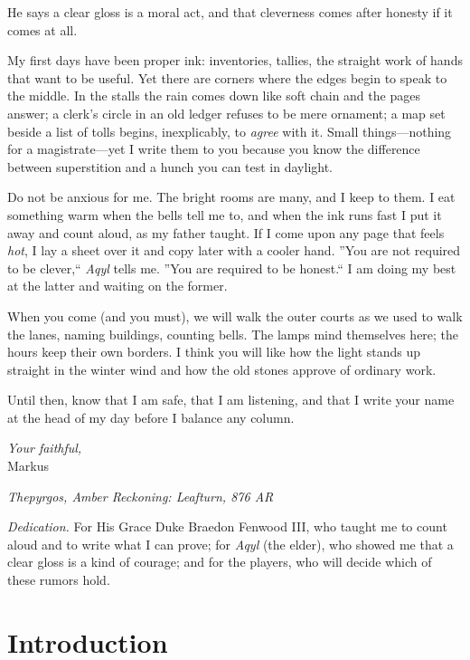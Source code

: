 \documentclass[11pt]{article}
\numberwithin{equation}{section} %
\theoremstyle{plain} %
\theoremstyle{definition} %
\theoremstyle{remark} %
\begin{document}
He says a clear gloss is a moral act, and that cleverness comes after honesty if it comes at all.

\medskip
My first days have been proper ink: inventories, tallies, the straight work of hands that want to be useful. Yet there are corners where the edges begin to speak to the middle. In the stalls the rain comes down like soft chain and the pages answer; a clerk's circle in an old ledger refuses to be mere ornament; a map set beside a list of tolls begins, inexplicably, to \emph{agree} with it. Small things---nothing for a magistrate---yet I write them to you because you know the difference between superstition and a hunch you can test in daylight.

Do not be anxious for me. The bright rooms are many, and I keep to them. I eat something warm when the bells tell me to, and when the ink runs fast I put it away and count aloud, as my father taught. If I come upon any page that feels \emph{hot}, I lay a sheet over it and copy later with a cooler hand. ''You are not required to be clever,`` \textit{Aqyl} tells me. ''You are required to be honest.`` I am doing my best at the latter and waiting on the former.

\medskip
When you come (and you must), we will walk the outer courts as we used to walk the lanes, naming buildings, counting bells. The lamps mind themselves here; the hours keep their own borders. I think you will like how the light stands up straight in the winter wind and how the old stones approve of ordinary work.

Until then, know that I am safe, that I am listening, and that I write your name at the head of my day before I balance any column.

\medskip
\noindent\textit{Your faithful,}\\
Markus

\begin{flushright}
\textit{Thepyrgos, Amber Reckoning: Leafturn, 876 AR}
\end{flushright}

\medskip
\noindent\textit{Dedication.} For His Grace Duke Braedon Fenwood III, who taught me to count aloud and to write what I can prove; for \textit{Aqyl} (the elder), who showed me that a clear gloss is a kind of courage; and for the players, who will decide which of these rumors hold.

\clearpage


\section{Introduction}
\label{sec:introduction}
\end{document}
